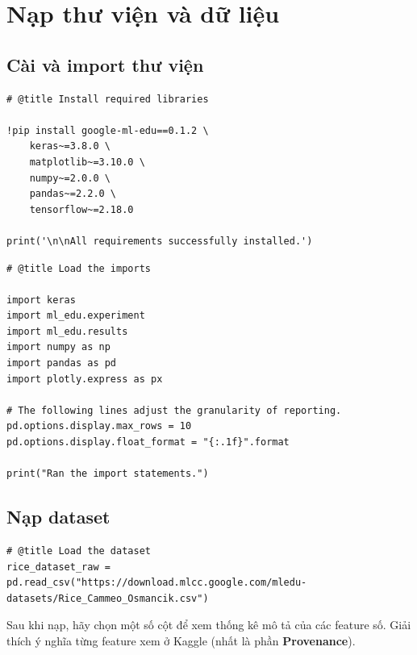\documentclass[12pt,a4paper]{article}
\begin{document}
\newpage

\section{Nạp thư viện và dữ liệu}

\subsection{Cài và import thư viện}

\begin{lstlisting}
# @title Install required libraries

!pip install google-ml-edu==0.1.2 \
    keras~=3.8.0 \
    matplotlib~=3.10.0 \
    numpy~=2.0.0 \
    pandas~=2.2.0 \
    tensorflow~=2.18.0

print('\n\nAll requirements successfully installed.')
\end{lstlisting}

\begin{lstlisting}
# @title Load the imports

import keras
import ml_edu.experiment
import ml_edu.results
import numpy as np
import pandas as pd
import plotly.express as px

# The following lines adjust the granularity of reporting.
pd.options.display.max_rows = 10
pd.options.display.float_format = "{:.1f}".format

print("Ran the import statements.")
\end{lstlisting}

\subsection{Nạp dataset}

\begin{lstlisting}
# @title Load the dataset
rice_dataset_raw = pd.read_csv("https://download.mlcc.google.com/mledu-datasets/Rice_Cammeo_Osmancik.csv")
\end{lstlisting}

\begin{phuongphap}[title={Chọn cột và xem thống kê mô tả}]
Sau khi nạp, hãy chọn một số cột để xem thống kê mô tả của các feature số.
Giải thích ý nghĩa từng feature xem ở Kaggle (nhất là phần \textbf{Provenance}).
\end{phuongphap}
\end{document}
